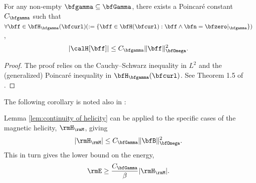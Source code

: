     \line

    \begin{lemma}\label{lem:continuity of helicity}
        For any non-empty $\bfgamma  \subseteq  \bfGamma$, there exists a Poincaré constant $C_{\bfgamma}$ such that $\forall  \bff  \in  \bfH_{\bfgamma}(\bfcurl)  (:=  \{\bff \in \bfH(\bfcurl) : \bff\wedge\bfn = \bfzero|_{\bfgamma}\})$,
        \begin{equation}
            |\calH[\bff]|  \leq  C_{\bfgamma}\|\bff\|_{\bfOmega}^{2}.
        \end{equation}
    \end{lemma}
    \begin{proof}
        The proof relies on the Cauchy--Schwarz inequality in $L^{2}$ and the (generalized) Poincaré inequality in $\bfH_{\bfgamma}(\bfcurl)$. See Theorem 1.5 of \cite{Arnold_Khesin_2008}.
    \end{proof}

    The following corollary is noted also in \cite{Arnold_Khesin_2008}:

    \begin{corollary}
        Lemma \ref{lem:continuity of helicity} can be applied to the specific cases of the magnetic helicity, $\rmH_{\rmM}$, giving
        \begin{equation}
            |\rmH_{\rmM}|  \leq  C_{\bfGamma}\|\bfB\|_{\bfOmega}^{2}.
        \end{equation}
        This in turn gives the lower bound on the energy,
        \begin{equation}
            \rmE  \geq  \frac{C_{\bfGamma}}{\beta}|\rmH_{\rmM}|.
        \end{equation}
    \end{corollary}
